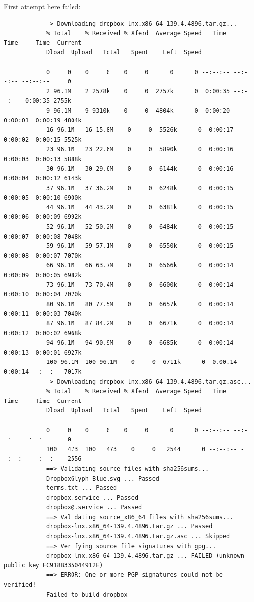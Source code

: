 \documentclass[]{scrartcl}
\begin{document}
	First attempt here failed:
	\begin{small}
		\begin{verbatim}
			-> Downloading dropbox-lnx.x86_64-139.4.4896.tar.gz...
			% Total    % Received % Xferd  Average Speed   Time    Time     Time  Current
			Dload  Upload   Total   Spent    Left  Speed
			
			0     0    0     0    0     0      0      0 --:--:-- --:--:-- --:--:--     0
			2 96.1M    2 2578k    0     0  2757k      0  0:00:35 --:--:--  0:00:35 2755k
			9 96.1M    9 9310k    0     0  4804k      0  0:00:20  0:00:01  0:00:19 4804k
			16 96.1M   16 15.8M    0     0  5526k      0  0:00:17  0:00:02  0:00:15 5525k
			23 96.1M   23 22.6M    0     0  5890k      0  0:00:16  0:00:03  0:00:13 5888k
			30 96.1M   30 29.6M    0     0  6144k      0  0:00:16  0:00:04  0:00:12 6143k
			37 96.1M   37 36.2M    0     0  6248k      0  0:00:15  0:00:05  0:00:10 6900k
			44 96.1M   44 43.2M    0     0  6381k      0  0:00:15  0:00:06  0:00:09 6992k
			52 96.1M   52 50.2M    0     0  6484k      0  0:00:15  0:00:07  0:00:08 7048k
			59 96.1M   59 57.1M    0     0  6550k      0  0:00:15  0:00:08  0:00:07 7070k
			66 96.1M   66 63.7M    0     0  6566k      0  0:00:14  0:00:09  0:00:05 6982k
			73 96.1M   73 70.4M    0     0  6600k      0  0:00:14  0:00:10  0:00:04 7020k
			80 96.1M   80 77.5M    0     0  6657k      0  0:00:14  0:00:11  0:00:03 7040k
			87 96.1M   87 84.2M    0     0  6671k      0  0:00:14  0:00:12  0:00:02 6968k
			94 96.1M   94 90.9M    0     0  6685k      0  0:00:14  0:00:13  0:00:01 6927k
			100 96.1M  100 96.1M    0     0  6711k      0  0:00:14  0:00:14 --:--:-- 7017k
			-> Downloading dropbox-lnx.x86_64-139.4.4896.tar.gz.asc...
			% Total    % Received % Xferd  Average Speed   Time    Time     Time  Current
			Dload  Upload   Total   Spent    Left  Speed
			
			0     0    0     0    0     0      0      0 --:--:-- --:--:-- --:--:--     0
			100   473  100   473    0     0   2544      0 --:--:-- --:--:-- --:--:--  2556
			==> Validating source files with sha256sums...
			DropboxGlyph_Blue.svg ... Passed
			terms.txt ... Passed
			dropbox.service ... Passed
			dropbox@.service ... Passed
			==> Validating source_x86_64 files with sha256sums...
			dropbox-lnx.x86_64-139.4.4896.tar.gz ... Passed
			dropbox-lnx.x86_64-139.4.4896.tar.gz.asc ... Skipped
			==> Verifying source file signatures with gpg...
			dropbox-lnx.x86_64-139.4.4896.tar.gz ... FAILED (unknown public key FC918B335044912E)
			==> ERROR: One or more PGP signatures could not be verified!
			Failed to build dropbox
		\end{verbatim}
	\end{small}
	
\end{document}

